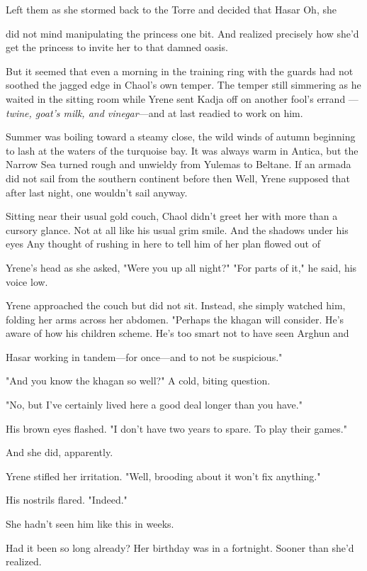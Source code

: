 Left them as she stormed back to the Torre and decided that Hasar
 Oh, she

did not mind manipulating the princess one bit. And realized precisely how she'd get the princess to invite her to that damned oasis.

But it seemed that even a morning in the training ring with the guards had not soothed the jagged edge in Chaol's own temper. The temper still simmering as he waited in the sitting room while Yrene sent Kadja off on another fool's errand ---\emph{twine, goat's milk, and vinegar}---and at last readied to work on him.

Summer was boiling toward a steamy close, the wild winds of autumn beginning to lash at the waters of the turquoise bay. It was always warm in Antica, but the Narrow Sea turned rough and unwieldy from Yulemas to Beltane. If an armada did not sail from the southern continent before then  Well, Yrene supposed that after last night, one wouldn't sail anyway.

Sitting near their usual gold couch, Chaol didn't greet her with more than a cursory glance. Not at all like his usual grim smile. And the shadows under his eyes  Any thought of rushing in here to tell him of her plan flowed out of

Yrene's head as she asked, "Were you up all night?" "For parts of it," he said, his voice low.

Yrene approached the couch but did not sit. Instead, she simply watched him, folding her arms across her abdomen. "Perhaps the khagan will consider. He's aware of how his children scheme. He's too smart not to have seen Arghun and

Hasar working in tandem---for once---and to not be suspicious."

"And you know the khagan so well?" A cold, biting question.

"No, but I've certainly lived here a good deal longer than you have."

His brown eyes flashed. "I don't have two years to spare. To play their games."

And she did, apparently.

Yrene stifled her irritation. "Well, brooding about it won't fix anything."

His nostrils flared. "Indeed."

She hadn't seen him like this in weeks.

Had it been so long already? Her birthday was in a fortnight. Sooner than she'd realized.

